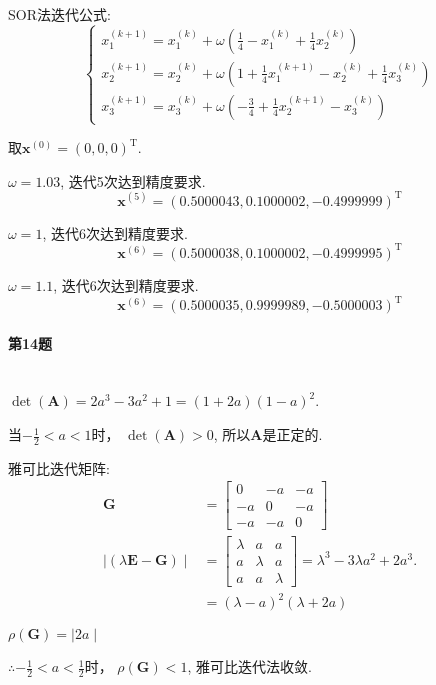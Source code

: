 \documentclass[a4paper]{article}
\begin{document}
SOR法迭代公式:
\begin{equation}
    \left\{\begin{array}{l}x_{1}^{(k+1)}=x_{1}^{(k)}+\omega\left(\frac{1}{4}-x_{1}^{(k)}+\frac{1}{4} x_{2}^{(k)}\right) \\ x_{2}^{(k+1)}=x_{2}^{(k)}+\omega\left(1+\frac{1}{4} x_{1}^{(k+1)}-x_{2}^{(k)}+\frac{1}{4} x_{3}^{(k)}\right) \\ x_{3}^{(k+1)}=x_{3}^{(k)}+\omega\left(-\frac{3}{4}+\frac{1}{4} x_{2}^{(k+1)}-x_{3}^{(k)}\right)\end{array} \nonumber\right.
\end{equation} \par
取$\boldsymbol{x}^{(0)} = (0, 0, 0)^{\mathrm{T}}$. \par
$\omega = 1.03$, 迭代5次达到精度要求.
$$\boldsymbol{x}^{(5)}=(0.5000043,0.1000002,-0.4999999)^{\mathrm{T}}$$ \par
$\omega = 1$, 迭代6次达到精度要求.
$$\boldsymbol{x}^{(6)}=(0.5000038,0.1000002,-0.4999995)^{\mathrm{T}}$$ \par
$\omega = 1.1$, 迭代6次达到精度要求.
$$\boldsymbol{x}^{(6)}=(0.5000035,0.9999989,-0.5000003)^{\mathrm{T}}$$ \par


\paragraph{第14题}~{}
\\

$\operatorname*{det}(\boldsymbol{A}) = 2a^3 - 3a^2 + 1 = (1+2a)(1-a)^2$.\par
当$-\frac{1}{2} < a < 1$时， $\operatorname*{det}(\boldsymbol{A}) > 0$, 所以$\boldsymbol{A}$是正定的. \par
雅可比迭代矩阵:
\begin{equation}
    \begin{aligned} \boldsymbol{G} & =\left[\begin{array}{rrr}0 & -a & -a \\ -a & 0 & -a \\ -a & -a & 0\end{array}\right] \\ \mid\left(\lambda \boldsymbol{E}-\boldsymbol{G}\right)\mid & =\left[\begin{array}{rrr}\lambda & a & a \\ a & \lambda & a \\ a & a & \lambda\end{array} \right]=\lambda^{3}-3 \lambda a^{2}+2 a^{3}. \\ & =(\lambda-a)^{2}(\lambda+2 a)\end{aligned} \nonumber
\end{equation}\par
$\rho\left(\boldsymbol{G}\right)=\mid 2 a \mid$ \par
$\therefore -\frac{1}{2} < a < \frac{1}{2}$时， $\rho\left(\boldsymbol{G}\right) <  1$, 雅可比迭代法收敛.
\newpage
\end{document}
